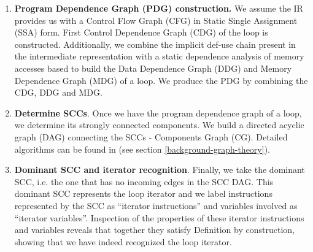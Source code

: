 \begin{enumerate}[align=left,leftmargin=*]
\item \textbf{Program Dependence Graph (PDG) construction.} We assume the IR provides us with a Control Flow Graph (CFG) in Static Single Assignment (SSA) form. First Control Dependence Graph (CDG) of the loop is constructed.
Additionally, we combine the implicit def-use chain present in the intermediate representation with a static dependence analysis of memory accesses based to build the Data Dependence Graph (DDG) and Memory Dependence Graph (MDG) of a loop. We produce the PDG by combining the CDG, DDG and MDG.
	
\item \textbf{Determine SCCs}. Once we have the program dependence graph of a loop, we determine its strongly connected components. We build a directed acyclic graph (DAG) connecting the SCCs - Components Graph (CG). Detailed algorithms can be found in \cite{introduction-to-algorithms-book} (see section \ref{background-graph-theory}).    
	
\item \textbf{Dominant SCC and iterator recognition}. Finally, we take the dominant SCC, i.e. the one that has no incoming edges in the SCC DAG. This dominant SCC represents the	loop iterator and we label instructions represented by the SCC as “iterator instructions” and variables involved as “iterator variables”. Inspection of the properties of these iterator instructions and variables reveals that together they satisfy Definition by construction, showing that we have indeed recognized the loop iterator.

\end{enumerate}

